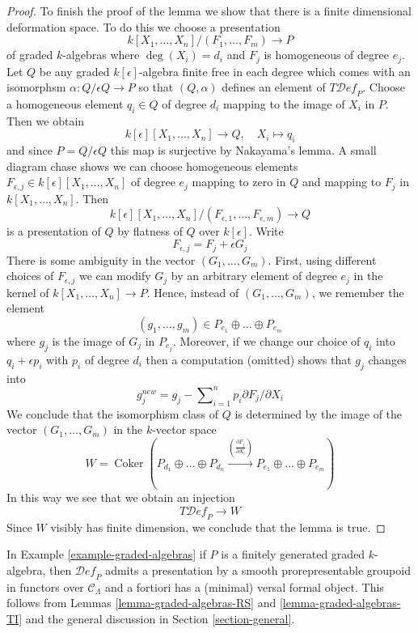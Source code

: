 \documentclass{stacks-project}
\theoremstyle{plain}
\theoremstyle{definition}
\theoremstyle{remark}
\numberwithin{equation}{subsection}
\def\Coker{\mathop{\mathrm{Coker}}}
\def\Deformationcategory{\mathcal{D}\!\mathit{ef}}
\begin{document}
\begin{proof}
\medskip\noindent
To finish the proof of the lemma we show that there is a finite
dimensional deformation space. To do this we
choose a presentation
$$
k[X_1, \ldots, X_n]/(F_1, \ldots, F_m) \longrightarrow P
$$
of graded $k$-algebras where $\deg(X_i) = d_i$ and
$F_j$ is homogeneous of degree $e_j$.
Let $Q$ be any graded $k[\epsilon]$-algebra
finite free in each degree which comes with an isomorphsm
$\alpha : Q/\epsilon Q \to P$ so that $(Q, \alpha)$ defines
an element of $T\Deformationcategory_P$.
Choose a homogeneous element $q_i \in Q$ of degree $d_i$
mapping to the image of $X_i$ in $P$.
Then we obtain
$$
k[\epsilon][X_1, \ldots, X_n] \longrightarrow Q,\quad
X_i \longmapsto q_i
$$
and since $P = Q/\epsilon Q$ this map is surjective by Nakayama's lemma.
A small diagram chase shows we can choose homogeneous elements
$F_{\epsilon, j} \in k[\epsilon][X_1, \ldots, X_n]$ of degree $e_j$
mapping to zero in $Q$ and mapping to $F_j$ in $k[X_1, \ldots, X_n]$.
Then
$$
k[\epsilon][X_1, \ldots, X_n]/(F_{\epsilon, 1}, \ldots, F_{\epsilon, m})
\longrightarrow Q
$$
is a presentation of $Q$ by flatness of $Q$ over $k[\epsilon]$.
Write
$$
F_{\epsilon, j} =  F_j + \epsilon G_j
$$
There is some ambiguity in the vector $(G_1, \ldots, G_m)$.
First, using different choices of $F_{\epsilon, j}$
we can modify $G_j$ by an arbitrary element of degree $e_j$
in the kernel of $k[X_1, \ldots, X_n] \to P$.
Hence, instead of $(G_1, \ldots, G_m)$, we remember the
element
$$
(g_1, \ldots, g_m) \in P_{e_1} \oplus \ldots \oplus P_{e_m}
$$
where $g_j$ is the image of $G_j$ in $P_{e_j}$.
Moreover, if we change our choice of $q_i$ into $q_i + \epsilon p_i$
with $p_i$ of degree $d_i$ then a computation (omitted) shows
that $g_j$ changes into
$$
g_j^{new} = g_j - \sum\nolimits_{i = 1}^n p_i \partial F_j / \partial X_i
$$
We conclude that the isomorphism class of $Q$ is determined by the
image of the vector $(G_1, \ldots, G_m)$ in the $k$-vector space
$$
W  = \Coker(P_{d_1} \oplus \ldots \oplus P_{d_n}
\xrightarrow{(\frac{\partial F_j}{\partial X_i})}
P_{e_1} \oplus \ldots \oplus P_{e_m})
$$
In this way we see that we obtain an injection
$$
T\Deformationcategory_P \longrightarrow W
$$
Since $W$ visibly has finite dimension, we conclude that the lemma is true.
\end{proof}

\noindent
In Example \ref{example-graded-algebras} if $P$ is a finitely generated
graded $k$-algebra, then $\Deformationcategory_P$
admits a presentation by a smooth prorepresentable groupoid in functors
over $\mathcal{C}_\Lambda$
and a fortiori has a (minimal) versal formal object. This follows
from Lemmas \ref{lemma-graded-algebras-RS} and
\ref{lemma-graded-algebras-TI}
and the general discussion in Section \ref{section-general}.
\end{document}
